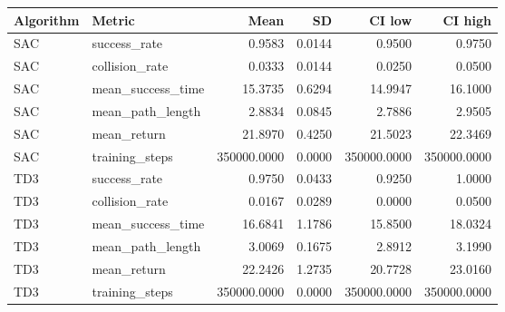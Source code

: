 \begin{tabular}{llrrrr}
Algorithm & Metric & Mean & SD & CI low & CI high \\
\hline
SAC & success\_rate & 0.9583 & 0.0144 & 0.9500 & 0.9750 \\
SAC & collision\_rate & 0.0333 & 0.0144 & 0.0250 & 0.0500 \\
SAC & mean\_success\_time & 15.3735 & 0.6294 & 14.9947 & 16.1000 \\
SAC & mean\_path\_length & 2.8834 & 0.0845 & 2.7886 & 2.9505 \\
SAC & mean\_return & 21.8970 & 0.4250 & 21.5023 & 22.3469 \\
SAC & training\_steps & 350000.0000 & 0.0000 & 350000.0000 & 350000.0000 \\
TD3 & success\_rate & 0.9750 & 0.0433 & 0.9250 & 1.0000 \\
TD3 & collision\_rate & 0.0167 & 0.0289 & 0.0000 & 0.0500 \\
TD3 & mean\_success\_time & 16.6841 & 1.1786 & 15.8500 & 18.0324 \\
TD3 & mean\_path\_length & 3.0069 & 0.1675 & 2.8912 & 3.1990 \\
TD3 & mean\_return & 22.2426 & 1.2735 & 20.7728 & 23.0160 \\
TD3 & training\_steps & 350000.0000 & 0.0000 & 350000.0000 & 350000.0000 \\
\end{tabular}
